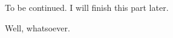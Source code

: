 \subsection*{\FactorizationOfPolynomialsOverQ}
\markright{\FactorizationOfPolynomialsOverQ}

To be continued. I will finish this part later.

Well, whatsoever.
